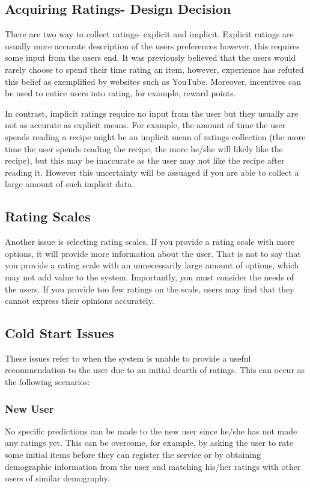 \subsection{Acquiring Ratings- Design Decision}

There are two way to collect ratings- explicit and implicit. Explicit ratings are usually more accurate description of the users preferences however, this requires some input from the users end. It was previously believed that the users would rarely choose to spend their time rating an item, however, experience has refuted this belief as exemplified by websites such as YouTube. Moreover, incentives can be used to entice users into rating, for example, reward points.

In contrast, implicit ratings require no input from the user but they usually are not as accurate as explicit means. For example, the amount of time the user spends reading a recipe might be an implicit mean of ratings collection (the more time the user spends reading the recipe, the more he/she will likely like the recipe), but this may be inaccurate as the user may not like the recipe after reading it. However this uncertainty will be assuaged if you are able to collect a large amount of such implicit data. 

\subsection{Rating Scales }

Another issue is selecting rating scales. If you provide a rating scale with more options, it will provide more information about the user. That is not to say that you provide a rating scale with an unnecessarily large amount of options, which may not add value to the system. Importantly, you must consider the needs of the users. If you provide too few ratings on the scale, users may find that they cannot express their opinions accurately. 

\subsection{Cold Start Issues}

These issues refer to when the system is unable to provide a useful recommendation to the user due to an initial dearth of ratings. This can occur as the following scenarios:

\subsubsection{New User}
No specific predictions can be made to the new user since he/she has not made any ratings yet. This can be overcome, for example, by asking the user to rate some initial items before they can register the service or by obtaining demographic information from the user and matching his/her ratings with other users of similar demography.

